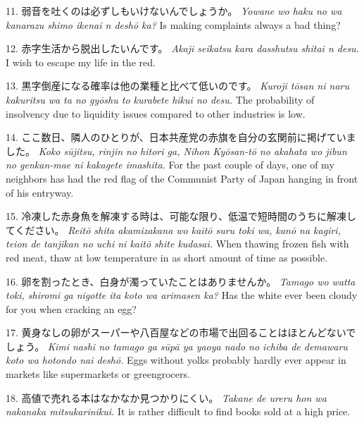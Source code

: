 \par{11. 弱音を吐くのは必ずしもいけないんでしょうか。 \hfill\break
 \emph{Yowane wo haku no wa kanarazu shimo ikenai n deshō ka? }\hfill\break
Is making complaints always a bad thing? }
 
\par{12. 赤字生活から脱出したいんです。 \hfill\break
 \emph{Akaji seikatsu kara dasshutsu shitai n desu. }\hfill\break
I wish to escape my life in the red. }
 
\par{13. 黒字倒産になる確率は他の業種と比べて低いのです。 \hfill\break
 \emph{Kuroji tōsan ni naru kakuritsu wa ta no gyōshu to kurabete hikui no desu. }\hfill\break
The probability of insolvency due to liquidity issues compared to other industries is low. }
 
\par{14. ここ数日、隣人のひとりが、日本共産党の赤旗を自分の玄関前に掲げていました。 \hfill\break
 \emph{Koko sūjitsu, rinjin no hitori ga, Nihon Kyōsan-tō no akahata wo jibun no genkan-mae ni kakagete imashita. }\hfill\break
For the past couple of days, one of my neighbors has had the red flag of the Communist Party of Japan hanging in front of his entryway. }
 
\par{15. 冷凍した赤身魚を解凍する時は、可能な限り、低温で短時間のうちに解凍してください。 \hfill\break
\emph{Reitō shita akamizakana wo kaitō suru toki wa, kanō na kagiri, teion de tanjikan no uchi ni kaitō shite kudasai. }\hfill\break
When thawing frozen fish with red meat, thaw at low temperature in as short amount of time as possible. }
 
\par{16. 卵を割ったとき、白身が濁っていたことはありませんか。 \hfill\break
 \emph{Tamago wo watta toki, shiromi ga nigotte ita koto wa arimasen ka? }\hfill\break
Has the white ever been cloudy for you when cracking an egg? }
 
\par{17. 黄身なしの卵がスーパーや八百屋などの市場で出回ることはほとんどないでしょう。 \hfill\break
 \emph{Kimi nashi no tamago ga sūpā ya yaoya nado no ichiba de demawaru koto wa hotondo nai deshō. \hfill\break
 }Eggs without yolks probably hardly ever appear in markets like supermarkets or greengrocers. }
 
\par{18. 高値で売れる本はなかなか見つかりにくい。 \hfill\break
 \emph{Takane de ureru hon wa nakanaka mitsukarinikui. }\hfill\break
It is rather difficult to find books sold at a high price. }
 
